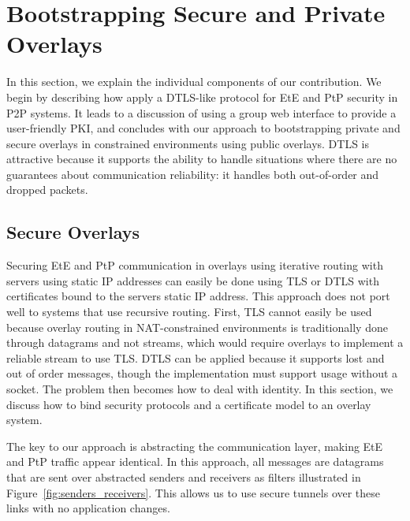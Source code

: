 \documentclass[conference]{IEEEtran}
\begin{document}
\section{Bootstrapping Secure and Private Overlays}
\label{contributions}
In this section, we explain the individual components of our contribution.  We
begin by describing how apply a DTLS-like protocol for EtE and PtP security in
P2P systems. It leads to a discussion of using a group web interface to
provide a user-friendly PKI, and concludes with our approach to bootstrapping
private and secure overlays in constrained environments using public overlays.
DTLS is attractive because it supports the ability to handle situations where
there are no guarantees about communication reliability: it handles both
out-of-order and dropped packets.


\subsection{Secure Overlays}
\label{secure_overlays}
Securing EtE and PtP communication in overlays using iterative routing with
servers using static IP addresses can easily be done using TLS or DTLS with
certificates bound to the servers static IP address.  This approach does not
port well to systems that use recursive routing. First, TLS cannot easily be used
because overlay routing in NAT-constrained environments is traditionally done through datagrams and not streams,
which would require overlays to implement a reliable stream to use TLS. 
DTLS can be applied because it supports lost and out of order messages, though
the implementation must support usage without a socket.  The
problem then becomes how to deal with identity.  In this section, we discuss how
to bind security protocols and a certificate model to an overlay system.

The key to our approach is abstracting the communication layer, making EtE and
PtP traffic appear identical. In this approach, all messages are datagrams that are sent
over abstracted senders and receivers as filters illustrated in
Figure~\ref{fig:senders_receivers}.  This allows us to use secure tunnels over
these links with no application changes.
\end{document}
